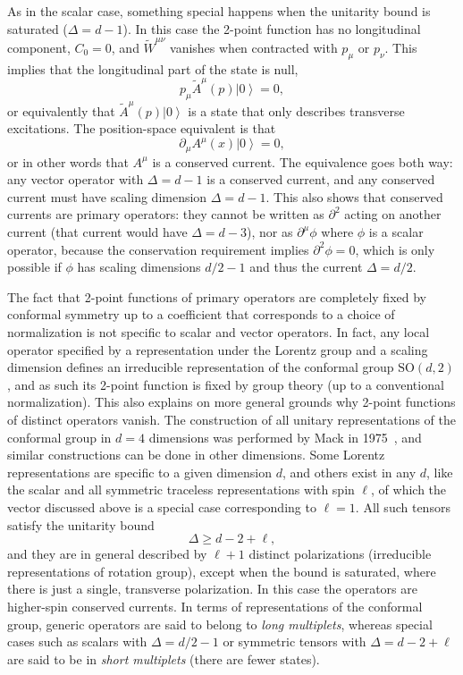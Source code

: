 \documentclass[a4paper,12pt]{article}
\newcommand{\ket}[1]{\left| #1 \right\rangle}
\newcommand{\SO}{\text{SO}}
\numberwithin{equation}{section}
\begin{document}
As in the scalar case, something special happens when the unitarity bound is saturated ($\Delta = d - 1$). In this case the 2-point function has no longitudinal component, $C_0 = 0$,
and $\widetilde{W}^{\mu\nu}$ vanishes when contracted with $p_\mu$ or $p_\nu$. This implies that the longitudinal part of the state is null,
\begin{equation}
	p_\mu \widetilde{A}^\mu(p) \ket{0} = 0,
\end{equation}
or equivalently that $\widetilde{A}^\mu(p) \ket{0}$ is a state that only describes transverse excitations.
The position-space equivalent is that 
\begin{equation}
	\partial_\mu A^\mu(x) \ket{0} = 0,
\end{equation}
or in other words that $A^\mu$ is a conserved current.
The equivalence goes both way: any vector operator with $\Delta = d - 1$ is a conserved current, and any conserved current must have scaling dimension $\Delta = d - 1$. This also shows that conserved currents are  primary operators: they cannot be written as $\partial^2$ acting on another current (that current would have $\Delta = d - 3$), nor as $\partial^\mu \phi$ where $\phi$ is a scalar operator, because the conservation requirement implies $\partial^2 \phi = 0$, which is only possible if $\phi$ has scaling dimensions $d/2 - 1$ and thus the current $\Delta = d/2$.


The fact that 2-point functions of primary operators are completely fixed by conformal symmetry up to a coefficient that corresponds to a choice of normalization is not specific to scalar and vector operators. In fact, any local operator specified by a representation under the Lorentz group and a scaling dimension defines an irreducible representation of the conformal group $\SO(d,2)$, and as such its 2-point function is fixed by group theory (up to a conventional normalization). This also explains on more general grounds why 2-point functions of distinct operators vanish.
The construction of all unitary representations of the conformal group in $d = 4$ dimensions was performed by Mack in 1975~\cite{Mack:1975je}, and similar constructions can be done in other dimensions. 
Some Lorentz representations are specific to a given dimension $d$, and others exist in any $d$, like the scalar and all symmetric traceless representations with spin $\ell$, of which the vector discussed above is a special case corresponding to $\ell = 1$. All such tensors satisfy the unitarity bound
\begin{equation}
	\Delta \geq d - 2 + \ell,
	\label{eq:unitaritybound:symmetricops}
\end{equation}
and they are in general described by $\ell + 1$ distinct polarizations (irreducible representations of rotation group), except when the bound is saturated, where there is just a single, transverse polarization. In this case the operators are higher-spin conserved currents.
In terms of representations of the conformal group, generic operators are said to belong to \emph{long multiplets}, whereas special cases such as scalars with $\Delta = d/2 - 1$ or symmetric tensors with $\Delta = d - 2 + \ell$ are said to be in \emph{short multiplets} (there are fewer states). 
\end{document}
